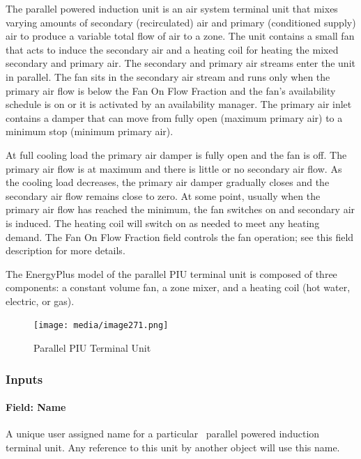 The parallel powered induction unit is an air system terminal unit that mixes varying amounts of secondary (recirculated) air and primary (conditioned supply) air to produce a variable total flow of air to a zone. The unit contains a small fan that acts to induce the secondary air and a heating coil for heating the mixed secondary and primary air. The secondary and primary air streams enter the unit in parallel. The fan sits in the secondary air stream and runs only when the primary air flow is below the Fan On Flow Fraction and the fan's availability schedule is on or it is activated by an availability manager. The primary air inlet contains a damper that can move from fully open (maximum primary air) to a minimum stop (minimum primary air).

At full cooling load the primary air damper is fully open and the fan is off. The primary air flow is at maximum and there is little or no secondary air flow. As the cooling load decreases, the primary air damper gradually closes and the secondary air flow remains close to zero. At some point, usually when the primary air flow has reached the minimum, the fan switches on and secondary air is induced. The heating coil will switch on as needed to meet any heating demand. The Fan On Flow Fraction field controls the fan operation; see this field description for more details.

The EnergyPlus model of the parallel PIU terminal unit is composed of three components: a constant volume fan, a zone mixer, and a heating coil (hot water, electric, or gas).

\begin{figure}[hbtp] %
\centering
\texttt{[image: media/image271.png]}
\caption{Parallel PIU Terminal Unit \protect \label{fig:parallel-piu-terminal-unit}}
\end{figure}

\subsubsection{Inputs}\label{inputs-8-000}

\paragraph{Field: Name}\label{field-name-8-000}

A unique user assigned name for a particular~ parallel powered induction terminal unit. Any reference to this unit by another object will use this name.

